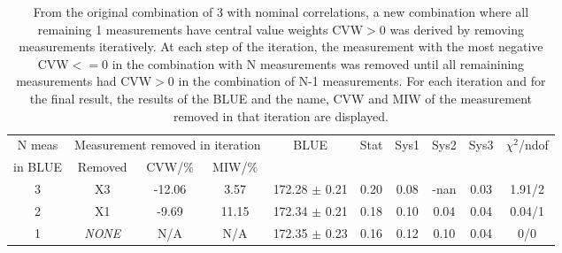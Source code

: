 \begin{table}[H]
\scriptsize
\begin{center}
\renewcommand{\arraystretch}{1.2}
\begin{tabular}{|c|c|c|c|c|cccc|c|}
\hline
N {\tiny meas} & \multicolumn{3}{c|}{Measurement removed in iteration} & \multirow{2}{*}{BLUE} & \multirow{2}{*}{\tiny Stat} & \multirow{2}{*}{\tiny Sys1} & \multirow{2}{*}{\tiny Sys2} & \multirow{2}{*}{\tiny Sys3} & \multirow{2}{*}{\tiny$\chi^2$/ndof}\\
\cline{2-4}
{\tiny in BLUE} & Removed & CVW/\% & MIW/\% & & & & & & \\\hline
3 & X3 &     -12.06 &       3.57 &     172.28 $\pm$      0.21 &       0.20 &       0.08 &       -nan &       0.03 &       1.91/2 \\
2 & X1 &      -9.69 &      11.15 &     172.34 $\pm$      0.21 &       0.18 &       0.10 &       0.04 &       0.04 &       0.04/1 \\
\hline
1 & {\em NONE} & N/A & N/A & 
    172.35 $\pm$      0.23 &       0.16 &       0.12 &       0.10 &       0.04 &  0/0 \\
\hline
\end{tabular}
\caption{From the original combination of 3 with nominal correlations, a new combination where all remaining 1 measurements have central value weights CVW$>$0 was derived by removing measurements iteratively. At each step of the iteration, the measurement with the most negative CVW$<=$0 in the combination with N measurements was removed until all remainining measurements had CVW$>$0 in the combination of N-1 measurements. For each iteration and for the final result, the results of the BLUE and the name, CVW and MIW of the measurement removed in that iteration are displayed.}
\renewcommand{\arraystretch}{1}
\end{center}
\end{table}
